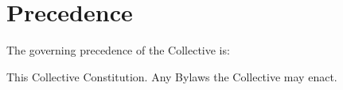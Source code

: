 \chapter{Precedence}\label{sec:precedence}
The governing precedence of the Collective is:
\begin{compactenum}[1.]
\itemnotoc This Collective Constitution.
\itemnotoc Any Bylaws the Collective may enact.
\end{compactenum}
